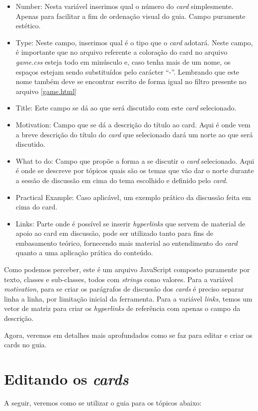 \begin{itemize}
    \item Number: Nesta variável inserimos qual o número do \textit{card} simplesmente. Apenas para facilitar a fim de ordenação visual do guia. Campo puramente estético.
    \item Type: Neste campo, inserimos qual é o tipo que o \textit{card} adotará. Neste campo, é importante que no arquivo referente a coloração do card no arquivo \textit{game.css} esteja todo em minúsculo e, caso tenha mais de um nome, os espaços estejam sendo substituídos pelo carácter ``-''. Lembrando que este nome também deve se encontrar escrito de forma igual no filtro presente no arquivo \ref{game.html}
    \item Title: Este campo se dá ao que será discutido com este \textit{card} selecionado.
    \item Motivation: Campo que se dá a descrição do título ao card. Aqui é onde vem a breve descrição do título do \textit{card} que selecionado dará um norte ao que será discutido. 
    \item What to do: Campo que propõe a forma a se discutir o \textit{card} selecionado. Aqui é onde se descreve por tópicos quais são os temas que vão dar o norte durante a sessão de discussão em cima do tema escolhido e definido pelo \textit{card}. 
    \item Practical Example: Caso aplicável, um exemplo prático da discussão feita em cima do card.
    \item Links: Parte onde é possível se inserir \textit{hyperlinks} que servem de material de apoio ao card em discussão, pode ser utilizado tanto para fins de embasamento teórico, fornecendo mais material ao entendimento do \textit{card} quanto a uma aplicação prática do conteúdo.
\end{itemize}

Como podemos perceber, este é um arquivo JavaScript composto puramente por texto, classes e sub-classes, todos com \textit{strings} como valores. Para a variável \textit{motivation}, para se criar os parágrafos de discussão dos \textit{cards} é preciso separar linha a linha, por limitação inicial da ferramenta. Para a variável \textit{links}, temos um vetor de matriz para criar os \textit{hyperlinks} de referência com apenas o campo da descrição.

Agora, veremos em detalhes mais aprofundados como se faz para editar e criar os cards no guia.

\section{Editando os \textit{cards}}
\label{editandocards}
A seguir, veremos como se utilizar o guia para os tópicos abaixo:

